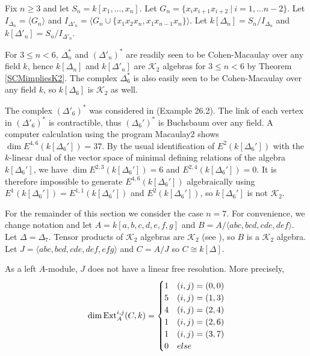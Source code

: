 \documentclass[11pt,righttag]{amsart}
\begin{document}
Fix $n\ge 3$ and let $S_n=k[x_1,\ldots,x_n]$. Let $G_n= \{ x_ix_{i+1}x_{i+2}\ |\ i=1,\ldots n-2\}$.  Let $I_{{\Delta}_n}={\langle} G_n{\rangle}$ and $I_{{\Delta}'_n}={\langle} G_n\cup \{x_1x_2x_n, x_1x_{n-1}x_n\}{\rangle}$.  Let $k[{\Delta}_n]=S_n/I_{{\Delta}_n}$ and $k[{\Delta}'_n]=S_n/I_{{\Delta}'_n}$.

For $3\le n<6$, ${\Delta}_n^*$ and $({\Delta}'_n)^*$ are readily seen to be Cohen-Macaulay over any field $k$, hence $k[{\Delta}_n]$ and $k[{\Delta}'_n]$ are ${{\mathcal K}}_2$ algebras for $3\le n< 6$ by Theorem \ref{SCMimpliesK2}. The complex ${\Delta}_6^*$ is also easily seen to be Cohen-Macaulay over any field $k$, so $k[{\Delta}_6]$ is ${{\mathcal K}}_2$ as well.

The complex $({\Delta}'_6)^*$ was considered in \cite{Hibi} (Example 26.2). The link of each vertex in $({\Delta}'_6)^*$ is contractible, thus $({\Delta}_6')^*$ is Buchsbaum over any field. A computer calculation using the program Macaulay2 shows  $\dim E^{4,6}(k[{\Delta}_6'])=37$.  By the usual identification of $E^2(k[{\Delta}_6'])$  with the $k$-linear dual of the vector space of minimal defining relations of the algebra $k[{\Delta}_6']$, we have $\dim E^{2,3}(k[{\Delta}_6'])=6$ and $E^{2,4}(k[{\Delta}_6'])=0$. It is therefore impossible to generate $E^{4,6}(k[{\Delta}_6'])$ algebraically using $E^1(k[{\Delta}_6'])=E^{1,1}(k[{\Delta}_6'])$ and $E^2(k[{\Delta}_6'])$, so $k[{\Delta}_6']$ is not ${{\mathcal K}}_2$. 

For the remainder of this section we consider the case $n=7$. For convenience, we change notation and let $A=k[a,b,c,d,e,f,g]$ and $B=A/{\langle} abc, bcd, cde, def {\rangle}$. Let ${\Delta}={\Delta}_7$. Tensor products of $\mathcal K_2$ algebras are $\mathcal K_2$ (see \cite{CS}), so $B$ is a $\mathcal K_2$ algebra. Let $J={\langle} abc, bcd, cde, def, efg {\rangle}$ and $C=A/J$ so $C{\cong} k[{\Delta}]$.

\begin{lemma}
\label{bettiNos}
As a left $A$-module, $J$ does not have a linear free resolution. More precisely,
$$\dim {\hbox{{\rm Ext}}}_A^{i,j}(C,k)=\begin{cases} 1 & (i,j)=(0,0)\\ 5 & (i,j)=(1,3)\\ 4 &(i,j)=(2,4)\\ 1 & (i,j)=(2,6)\\ 1 & (i,j)=(3,7)\\ 0 & else\\ \end{cases}$$
\end{lemma}
\end{document}
